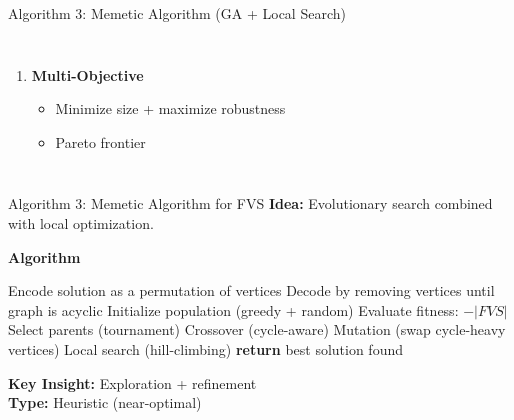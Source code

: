 \documentclass[aspectratio=169]{beamer}
\begin{document}
\begin{frame}{Algorithm 3: Memetic Algorithm (GA + Local Search)}
\begin{columns}[T]
\begin{enumerate}
			\item \textbf{Multi-Objective}
			      \begin{itemize}
				      \scriptsize
				      \item Minimize size + maximize robustness
				      \item Pareto frontier
			      \end{itemize}
		\end{enumerate}

	\end{columns}
\end{frame}


\begin{frame}{Algorithm 3: Memetic Algorithm for FVS}
\small
\textbf{Idea:} Evolutionary search combined with local optimization.

\textbf{Algorithm}
\begin{algorithmic}[1]
  \State Encode solution as a permutation of vertices
  \State Decode by removing vertices until graph is acyclic
  \State Initialize population (greedy + random)
    \State Evaluate fitness: $-|FVS|$
    \State Select parents (tournament)
    \State Crossover (cycle-aware)
    \State Mutation (swap cycle-heavy vertices)
    \State Local search (hill-climbing)
  \EndFor
  \State \textbf{return} best solution found
\end{algorithmic}

\textbf{Key Insight:} Exploration + refinement \\
\textbf{Type:} Heuristic (near-optimal)
\end{frame}
\end{document}

